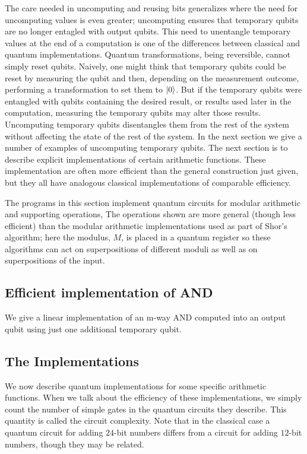 The care needed in uncomputing and reusing bits generalizes where the need for uncomputing values is even greater; uncomputing ensures that temporary qubits are no longer entagled with output qubits. This need to unentangle temporary values at the end of a computation is one of the differences between classical and quantum implementations. Quantum transformations, being reversible, cannot simply reset qubits. Naively, one might think that temporary qubits could be reset by measuring the qubit and then, depending on the measurement outcome, performing a transformation to set them to $\ket{0}$. But if the temporary qubits were entangled with qubits containing the desired result, or results used later in the computation, measuring the temporary qubits may alter those results. Uncomputing temporary qubits disentangles them from the rest of the system without affecting the state of the rest of the system. In the next section we give a number of examples of uncomputing temporary qubits.
The next section is to describe explicit implementations of certain arithmetic functions. These implementation are often more efficient than the general construction just given, but they all have analogous classical implementations of comparable efficiency.

The programs in this section implement quantum circuits for modular arithmetic and supporting operations, The operations shown are more general (though less efficient) than the modular arithmetic implementations used as part of Shor's algorithm; here the modulus, $M$, is placed in a quantum register so these algorithms can act on superpositions of different moduli as well as on superpositions of the input.

\subsection{Efficient implementation of AND}
We give a linear implementation of an m-way AND computed into an output qubit using just one additional temporary qubit.

\subsection{The Implementations}
We now describe quantum implementations for some specific arithmetic functions. When we talk about the efficiency of these implementations, we simply count the number of simple gates in the quantum circuits they describe. This quantity is called the circuit complexity. Note that in the classical case a quantum circuit for adding $24$-bit numbers differs from a circuit for adding $12$-bit numbers, though they may be related. 

